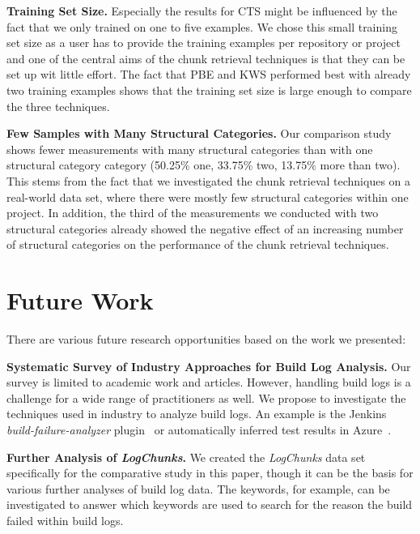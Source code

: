 \textbf{Training Set Size.}
Especially the results for CTS might be influenced by the fact that we
only trained on one to five examples.
We chose this small training set
size as a user has to provide the training examples
per repository or project and one of the central aims of the chunk
retrieval techniques is that they can be set up wit little effort.
The fact that PBE and KWS performed best with already two training
examples shows that the training set size is large enough to
compare the three techniques.

\textbf{Few Samples with Many Structural Categories.}
Our comparison study shows fewer measurements with many structural
categories than with one structural category category (50.25\% one,
33.75\% two, 13.75\% more than two).
This stems from the fact that we
investigated the chunk retrieval techniques on a real-world data set,
where there were mostly few structural categories within one project.
In addition, the third of the measurements we conducted with two
structural categories already showed the negative effect of an
increasing number of structural categories on the performance of the
chunk retrieval techniques.

\section{Future Work}

There are various future research opportunities based on the
work we presented:

\textbf{Systematic Survey of Industry Approaches for Build
Log Analysis.}
Our survey is limited to academic work and articles.
However, handling build logs is a challenge for a wide range of
practitioners as well.
We propose to investigate the techniques used in industry to analyze
build logs.
An example is the Jenkins \emph{build-failure-analyzer}
plugin~\cite{jenkins2020failure-analyzer} or automatically
inferred test results in Azure~\cite{azure2020inferred}.

\textbf{Further Analysis of \emph{LogChunks}.}
We created the
\emph{LogChunks} data set \cite{brandt2020logchunks} specifically for
the comparative
study in this paper, though it can be the basis for various further
analyses of build log data.
The keywords, for example, can be
investigated to answer which keywords are used to search for the
reason the build failed within build logs.


